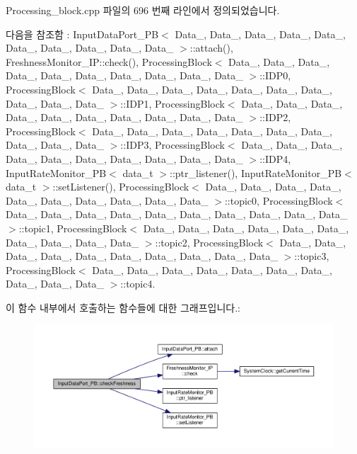 Processing\+\_\+block.\+cpp 파일의 696 번째 라인에서 정의되었습니다.



다음을 참조함 \+:  Input\+Data\+Port\+\_\+\+P\+B$<$ Data\+\_, Data\+\_, Data\+\_, Data\+\_, Data\+\_, Data\+\_, Data\+\_, Data\+\_, Data\+\_, Data\+\_ $>$\+::attach(), Freshness\+Monitor\+\_\+\+I\+P\+::check(), Processing\+Block$<$ Data\+\_, Data\+\_, Data\+\_, Data\+\_, Data\+\_, Data\+\_, Data\+\_, Data\+\_, Data\+\_, Data\+\_ $>$\+::\+I\+D\+P0, Processing\+Block$<$ Data\+\_, Data\+\_, Data\+\_, Data\+\_, Data\+\_, Data\+\_, Data\+\_, Data\+\_, Data\+\_, Data\+\_ $>$\+::\+I\+D\+P1, Processing\+Block$<$ Data\+\_, Data\+\_, Data\+\_, Data\+\_, Data\+\_, Data\+\_, Data\+\_, Data\+\_, Data\+\_, Data\+\_ $>$\+::\+I\+D\+P2, Processing\+Block$<$ Data\+\_, Data\+\_, Data\+\_, Data\+\_, Data\+\_, Data\+\_, Data\+\_, Data\+\_, Data\+\_, Data\+\_ $>$\+::\+I\+D\+P3, Processing\+Block$<$ Data\+\_, Data\+\_, Data\+\_, Data\+\_, Data\+\_, Data\+\_, Data\+\_, Data\+\_, Data\+\_, Data\+\_ $>$\+::\+I\+D\+P4, Input\+Rate\+Monitor\+\_\+\+P\+B$<$ data\+\_\+t $>$\+::ptr\+\_\+listener(), Input\+Rate\+Monitor\+\_\+\+P\+B$<$ data\+\_\+t $>$\+::set\+Listener(), Processing\+Block$<$ Data\+\_, Data\+\_, Data\+\_, Data\+\_, Data\+\_, Data\+\_, Data\+\_, Data\+\_, Data\+\_, Data\+\_ $>$\+::topic0, Processing\+Block$<$ Data\+\_, Data\+\_, Data\+\_, Data\+\_, Data\+\_, Data\+\_, Data\+\_, Data\+\_, Data\+\_, Data\+\_ $>$\+::topic1, Processing\+Block$<$ Data\+\_, Data\+\_, Data\+\_, Data\+\_, Data\+\_, Data\+\_, Data\+\_, Data\+\_, Data\+\_, Data\+\_ $>$\+::topic2, Processing\+Block$<$ Data\+\_, Data\+\_, Data\+\_, Data\+\_, Data\+\_, Data\+\_, Data\+\_, Data\+\_, Data\+\_, Data\+\_ $>$\+::topic3, Processing\+Block$<$ Data\+\_, Data\+\_, Data\+\_, Data\+\_, Data\+\_, Data\+\_, Data\+\_, Data\+\_, Data\+\_, Data\+\_ $>$\+::topic4.



이 함수 내부에서 호출하는 함수들에 대한 그래프입니다.\+:\nopagebreak
\begin{figure}[H]
\begin{center}
\leavevmode
\includegraphics[width=350pt]{classInputDataPort__PB_a43ed8a54ce27b50a0ac8a33f1f93e938_cgraph}
\end{center}
\end{figure}


